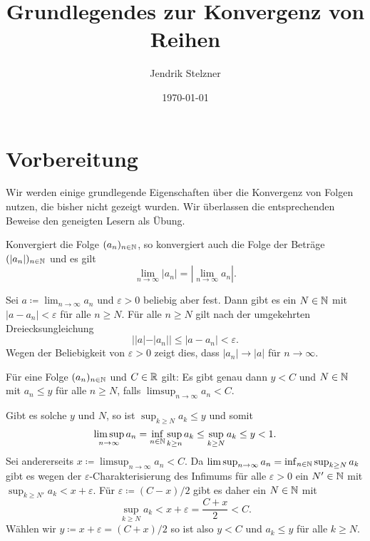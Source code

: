 \documentclass[a4paper,10pt]{article}
\title{Grundlegendes zur Konvergenz von Reihen}
\author{Jendrik Stelzner}
\date{\today}
\begin{document}
\maketitle

\tableofcontents





\section{Vorbereitung}


Wir werden einige grundlegende Eigenschaften über die Konvergenz von Folgen nutzen, die bisher nicht gezeigt wurden. Wir überlassen die entsprechenden Beweise den geneigten Lesern als Übung.


\begin{question}
 Konvergiert die Folge $(a_n)_{n \in \mathbb{N}}$, so konvergiert auch die Folge der Beträge $(|a_n|)_{n \in \mathbb{N}}$ und es gilt
 \[
  \lim_{n \to \infty} |a_n| = \left| \lim_{n \to \infty} a_n \right|.
 \]
\end{question}
\begin{solution}
 Sei $a \coloneqq \lim_{n \to \infty} a_n$ und $\varepsilon > 0$ beliebig aber fest. Dann gibt es ein $N \in \mathbb{N}$ mit $|a - a_n| < \varepsilon$ für alle $n \geq N$. Für alle $n \geq N$ gilt nach der umgekehrten Dreiecksungleichung
 \[
  ||a| - |a_n|| \leq |a - a_n| < \varepsilon.
 \]
 Wegen der Beliebigkeit von $\varepsilon > 0$ zeigt dies, dass $|a_n| \to |a|$ für $n \to \infty$.
\end{solution}


\begin{question}
 Für eine Folge $(a_n)_{n \in \mathbb{N}}$ und $C \in \mathbb{R}$ gilt: Es gibt genau dann $y < C$ und $N \in \mathbb{N}$ mit $a_n \leq y$ für alle $n \geq N$, falls $\limsup_{n \to \infty} a_n < C$.
\end{question}
\begin{solution}
 Gibt es solche $y$ und $N$, so ist $\sup_{k \geq N} a_k \leq y$ und somit
 \[
  \limsup_{n \to \infty} a_n
  = \inf_{n \in \mathbb{N}} \sup_{k \geq n} a_k
  \leq \sup_{k \geq N} a_k
  \leq y
  < 1.
 \]
 Sei andererseits $x \coloneqq \limsup_{n \to \infty} a_n < C$. Da $\limsup_{n \to \infty} a_n = \inf_{n \in \mathbb{N}} \sup_{k \geq N} a_k$ gibt es wegen der $\varepsilon$-Charakterisierung des Infimums für alle $\varepsilon > 0$ ein $N' \in \mathbb{N}$ mit $\sup_{k \geq N'} a_k < x + \varepsilon$. Für $\varepsilon \coloneqq (C-x)/2$ gibt es daher ein $N \in \mathbb{N}$ mit
 \[
  \sup_{k \geq N} a_k < x + \varepsilon = \frac{C + x}{2} < C.
 \]
 Wählen wir $y \coloneqq x + \varepsilon = (C+x)/2$ so ist also $y < C$ und $a_k \leq y$ für alle $k \geq N$.
\end{solution}
\end{document}
